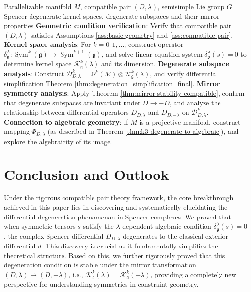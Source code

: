 \documentclass[a4paper,12pt]{extarticle}
\theoremstyle{plain}
\theoremstyle{definition}
\begin{document}
\begin{algorithm}[H]
\caption{Degeneration Phenomena and Mirror Symmetry Analysis Framework}
\label{alg:degeneration_and_mirror_analysis}
\begin{algorithmic}[1]
\Require Parallelizable manifold $M$, compatible pair $(D,\lambda)$, semisimple Lie group $G$
\Ensure Spencer degenerate kernel spaces, degenerate subspaces and their mirror properties
\State \textbf{Geometric condition verification}: Verify that compatible pair $(D,\lambda)$ satisfies Assumptions \ref{ass:basic-geometry} and \ref{ass:compatible-pair}.
\State \textbf{Kernel space analysis}: For $k=0, 1, \dots$, construct operator $\delta^\lambda_\mathfrak{g}: \operatorname{Sym}^k(\mathfrak{g}) \to \operatorname{Sym}^{k+1}(\mathfrak{g})$, and solve linear equation system $\delta^\lambda_\mathfrak{g}(s)=0$ to determine kernel space $\mathcal{K}^k_\mathfrak{g}(\lambda)$ and its dimension.
\State \textbf{Degenerate subspace analysis}: Construct $\mathcal{D}^k_{D,\lambda} = \Omega^k(M) \otimes \mathcal{K}^k_\mathfrak{g}(\lambda)$, and verify differential simplification Theorem \ref{thm:degeneration_simplification_final}.
\State \textbf{Mirror symmetry analysis}: Apply Theorem \ref{thm:mirror-stability-compatible}, confirm that degenerate subspaces are invariant under $D \to -D$, and analyze the relationship between differential operators $D_{D,\lambda}$ and $D_{D,-\lambda}$ on $\mathcal{D}^k_{D,\lambda}$.
\State \textbf{Connection to algebraic geometry}: If $M$ is a projective manifold, construct mapping $\Phi_{D,\lambda}$ (as described in Theorem \ref{thm:k3-degenerate-to-algebraic}), and explore the algebraicity of its image.
\end{algorithmic}
\end{algorithm}

\section{Conclusion and Outlook}
\label{sec:conclusion_and_outlook}

Under the rigorous compatible pair theory framework, the core breakthrough achieved in this paper lies in discovering and systematically elucidating the differential degeneration phenomenon in Spencer complexes. We proved that when symmetric tensors $s$ satisfy the $\lambda$-dependent algebraic condition $\delta_{\mathfrak{g}}^{\lambda}(s)=0$, the complex Spencer differential $D_{D,\lambda}$ degenerates to the classical exterior differential $d$. This discovery is crucial as it fundamentally simplifies the theoretical structure. Based on this, we further rigorously proved that this degeneration condition is stable under the mirror transformation $(D,\lambda) \mapsto (D,-\lambda)$, i.e., $\mathcal{K}_{\mathfrak{g}}^{k}(\lambda) = \mathcal{K}_{\mathfrak{g}}^{k}(-\lambda)$, providing a completely new perspective for understanding symmetries in constraint geometry.
\end{document}
